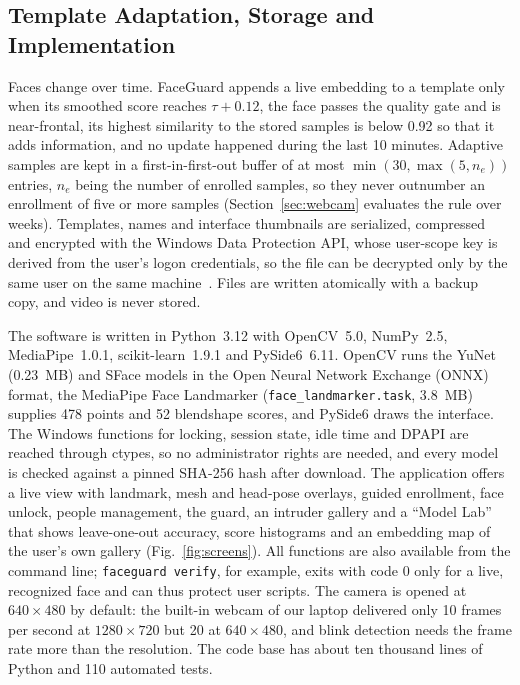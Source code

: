 \documentclass[journal]{IEEEtran}
\newcommand{\sys}{FaceGuard}
\begin{document}
\subsection{Template Adaptation, Storage and Implementation}\label{sec:adaptive}
Faces change over time. \sys{} appends a live embedding to a template only when its smoothed score reaches $\tau+0.12$, the face passes the quality gate and is near-frontal, its highest similarity to the stored samples is below 0.92 so that it adds information, and no update happened during the last 10 minutes. Adaptive samples are kept in a first-in-first-out buffer of at most $\min(30,\max(5,n_e))$ entries, $n_e$ being the number of enrolled samples, so they never outnumber an enrollment of five or more samples (Section~\ref{sec:webcam} evaluates the rule over weeks). Templates, names and interface thumbnails are serialized, compressed and encrypted with the Windows Data Protection API, whose user-scope key is derived from the user's logon credentials, so the file can be decrypted only by the same user on the same machine~\cite{ms2024dpapi}. Files are written atomically with a backup copy, and video is never stored.

The software is written in Python~3.12 with OpenCV~5.0, NumPy~2.5, MediaPipe~1.0.1, scikit-learn~1.9.1 and PySide6~6.11. OpenCV runs the YuNet (0.23~MB) and SFace models in the Open Neural Network Exchange (ONNX) format, the MediaPipe Face Landmarker (\texttt{face\_landmarker.task}, 3.8~MB) supplies 478 points and 52 blendshape scores, and PySide6 draws the interface. The Windows functions for locking, session state, idle time and DPAPI are reached through ctypes, so no administrator rights are needed, and every model is checked against a pinned SHA-256 hash after download. The application offers a live view with landmark, mesh and head-pose overlays, guided enrollment, face unlock, people management, the guard, an intruder gallery and a ``Model Lab'' that shows leave-one-out accuracy, score histograms and an embedding map of the user's own gallery (Fig.~\ref{fig:screens}). All functions are also available from the command line; \texttt{faceguard verify}, for example, exits with code 0 only for a live, recognized face and can thus protect user scripts. The camera is opened at $640\times480$ by default: the built-in webcam of our laptop delivered only 10 frames per second at $1280\times720$ but 20 at $640\times480$, and blink detection needs the frame rate more than the resolution. The code base has about ten thousand lines of Python and 110 automated tests.
\end{document}
